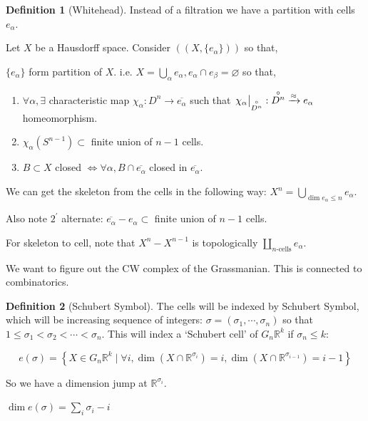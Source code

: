 \documentclass{article}
\theoremstyle{definition}
\newtheorem*{definition}{Definition}
\begin{document}
    \begin{definition}
        [Whitehead] Instead of a filtration we have a partition with cells \(e_\alpha\).

        Let \(X\) be a Hausdorff space. Consider \(\left( (X, \{ e_\alpha \}) \right)\) so that,

        \(\{ e_\alpha \} \) form partition of \(X\). i.e. \(X = \bigcup_{\alpha} e_\alpha, e_\alpha \cap e_\beta = \varnothing\) so that,

        \begin{enumerate}[label=\arabic*)]
            \item \(\forall \alpha, \exists\) characteristic map \(\chi_\alpha : D^n \to \overline{e_\alpha}\) such that \(\eval{\chi_\alpha}_{\overset{\circ}{D^n}}: \overset{\circ}{D^n}\xrightarrow{\approx} e_\alpha\) homeomorphism.
            \item \(\chi_\alpha (S^{n-1}) \subset\) finite union of \(n-1\) cells.
            \item \(B \subset X\) closed \(\iff \forall \alpha, B \cap \overline{e_{\alpha}}\) closed in \(\overline{e_\alpha}\).    
        \end{enumerate} 
    \end{definition}

    We can get the skeleton from the cells in the following way: \(X^n = \bigcup_{\dim e_\alpha \leq n} e_\alpha\).

    Also note \(2^{\prime}\) alternate: \(\overline{e_\alpha} - e_\alpha \subset\) finite union of \(n-1\) cells.

    For skeleton to cell, note that \(X^n - X^{n-1}\) is topologically \(\coprod_{n \text{-cells}} e_\alpha\).
    
    We want to figure out the CW complex of the Grassmanian. This is connected to combinatorics.

    \begin{definition}
        [Schubert Symbol] The cells will be indexed by Schubert Symbol, which will be increasing sequence of integers: \(\sigma  = (\sigma_1, \cdots , \sigma_n)\) so that \(1 \leq \sigma_1 < \sigma_2 < \cdots < \sigma_n\). This will index a `Schubert cell' of \(G_n \mathbb{R}^k\) if \(\sigma_n \leq k\):

        \[
            e(\sigma) = \left\{ X \in G_n \mathbb{R}^k \mid \forall i, \dim (X \cap \mathbb{R}^{\sigma_i}) = i, \dim (X \cap \mathbb{R}^{\sigma_{i-1}}) = i - 1 \right\} 
        \]

        So we have a dimension jump at \(\mathbb{R}^{\sigma_i}\).

        \(\dim e(\sigma) = \sum_{i} \sigma_i - i\)
    \end{definition}
\end{document}
